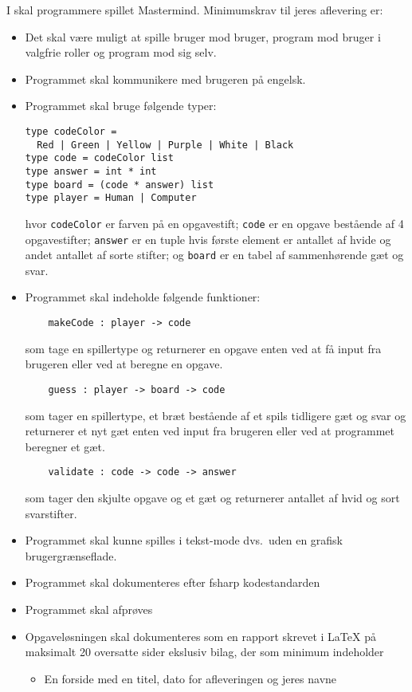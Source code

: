 I skal programmere spillet Mastermind. Minimumskrav til jeres aflevering er:
  \begin{itemize}
  \item Det skal være muligt at spille bruger mod bruger, program mod bruger i valgfrie roller og program mod sig selv.
  \item Programmet skal kommunikere med brugeren på engelsk.
  \item Programmet skal bruge følgende typer:
    \begin{lstlisting}
type codeColor = 
  Red | Green | Yellow | Purple | White | Black
type code = codeColor list
type answer = int * int
type board = (code * answer) list
type player = Human | Computer
  \end{lstlisting}
hvor \lstinline!codeColor! er farven på en opgavestift; \lstinline!code! er en opgave bestående af 4 opgavestifter; \lstinline!answer! er en tuple hvis første element er antallet af hvide og andet antallet af sorte stifter; og \lstinline!board! er en tabel af sammenhørende gæt og svar.
\item Programmet skal indeholde følgende funktioner:
  \begin{lstlisting}
    makeCode : player -> code
  \end{lstlisting}
  som tage en spillertype og returnerer en opgave enten ved at få input fra brugeren eller ved at beregne en opgave.
  \begin{lstlisting}
    guess : player -> board -> code
  \end{lstlisting}
  som tager en spillertype, et bræt bestående af et spils tidligere gæt og svar og returnerer et nyt gæt enten ved input fra brugeren eller ved at programmet beregner et gæt.
  \begin{lstlisting}
    validate : code -> code -> answer
  \end{lstlisting}
  som tager den skjulte opgave og et gæt og returnerer antallet af hvid og sort svarstifter.
\item Programmet skal kunne spilles i tekst-mode dvs.\ uden en grafisk brugergrænseflade.
\item Programmet skal dokumenteres efter fsharp kodestandarden
\item Programmet skal afprøves
  \item Opgaveløsningen skal dokumenteres som en rapport skrevet i LaTeX på maksimalt 20 oversatte sider ekslusiv bilag, der som minimum indeholder
    \begin{itemize}
    \item En forside med en titel, dato for afleveringen og jeres navne

\end{itemize}
\end{itemize}
